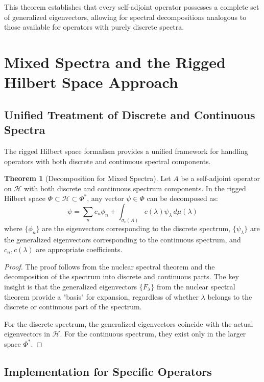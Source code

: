 \documentclass[12pt,a4paper]{article}
\theoremstyle{definition}
\newtheorem{theorem}{Theorem}
\begin{document}
This theorem establishes that every self-adjoint operator possesses a complete set of generalized eigenvectors, allowing for spectral decompositions analogous to those available for operators with purely discrete spectra.

\section{Mixed Spectra and the Rigged Hilbert Space Approach}

\subsection{Unified Treatment of Discrete and Continuous Spectra}

The rigged Hilbert space formalism provides a unified framework for handling operators with both discrete and continuous spectral components.

\begin{theorem}[Decomposition for Mixed Spectra]
Let $A$ be a self-adjoint operator on $\mathcal{H}$ with both discrete and continuous spectrum components. In the rigged Hilbert space $\Phi \subset \mathcal{H} \subset \Phi^*$, any vector $\psi \in \Phi$ can be decomposed as:
\begin{equation}
    \psi = \sum_{n} c_n \phi_n + \int_{\sigma_c(A)} c(\lambda) \psi_\lambda \, d\mu(\lambda)
\end{equation}
where $\{\phi_n\}$ are the eigenvectors corresponding to the discrete spectrum, $\{\psi_\lambda\}$ are the generalized eigenvectors corresponding to the continuous spectrum, and $c_n, c(\lambda)$ are appropriate coefficients.
\end{theorem}

\begin{proof}
The proof follows from the nuclear spectral theorem and the decomposition of the spectrum into discrete and continuous parts. The key insight is that the generalized eigenvectors $\{F_\lambda\}$ from the nuclear spectral theorem provide a "basis" for expansion, regardless of whether $\lambda$ belongs to the discrete or continuous part of the spectrum.

For the discrete spectrum, the generalized eigenvectors coincide with the actual eigenvectors in $\mathcal{H}$. For the continuous spectrum, they exist only in the larger space $\Phi^*$.
\end{proof}

\subsection{Implementation for Specific Operators}
\end{document}
